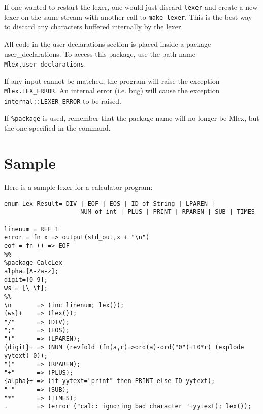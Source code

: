 If one wanted to restart the lexer, one would just discard {\tt lexer}
and create a new lexer on the same stream with another call to
{\tt make_lexer}.  This is the best way to discard any characters buffered
internally by the lexer.

All code in the user declarations section is placed inside a
package user_declarations.  To access this package, use the path name
{\tt Mlex.user_declarations}.

If any input cannot be matched, the program will raise the exception
{\tt Mlex.LEX_ERROR}.  An internal error (i.e.  bug) will cause the
exception {\tt internal::LEXER_ERROR} to be raised.

If {\tt \%package} is used, remember that the package name will no
longer be Mlex, but the one specified in the command.

\section{Sample}

Here is a sample lexer for a calculator program:

\small
\begin{verbatim}
enum Lex_Result= DIV | EOF | EOS | ID of String | LPAREN |
                     NUM of int | PLUS | PRINT | RPAREN | SUB | TIMES 

linenum = REF 1
error = fn x => output(std_out,x + "\n")
eof = fn () => EOF
%%
%package CalcLex
alpha=[A-Za-z];
digit=[0-9];
ws = [\ \t];
%%
\n       => (inc linenum; lex());
{ws}+    => (lex());
"/"      => (DIV);
";"      => (EOS);
"("      => (LPAREN);
{digit}+ => (NUM (revfold (fn(a,r)=>ord(a)-ord("0")+10*r) (explode yytext) 0));
")"      => (RPAREN);
"+"      => (PLUS);
{alpha}+ => (if yytext="print" then PRINT else ID yytext);
"-"      => (SUB);
"*"      => (TIMES);
.        => (error ("calc: ignoring bad character "+yytext); lex());
\end{verbatim}


